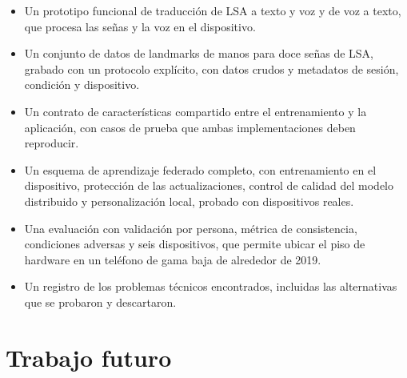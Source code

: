 \begin{itemize}
    \item Un prototipo funcional de traducción de LSA a texto y voz y de voz a texto, que procesa las señas y la voz en el dispositivo.
    \item Un conjunto de datos de landmarks de manos para doce señas de LSA, grabado con un protocolo explícito, con datos crudos y metadatos de sesión, condición y dispositivo.
    \item Un contrato de características compartido entre el entrenamiento y la aplicación, con casos de prueba que ambas implementaciones deben reproducir.
    \item Un esquema de aprendizaje federado completo, con entrenamiento en el dispositivo, protección de las actualizaciones, control de calidad del modelo distribuido y personalización local, probado con dispositivos reales.
    \item Una evaluación con validación por persona, métrica de consistencia, condiciones adversas y seis dispositivos, que permite ubicar el piso de hardware en un teléfono de gama baja de alrededor de 2019.
    \item Un registro de los problemas técnicos encontrados, incluidas las alternativas que se probaron y descartaron.
\end{itemize}

\section{Trabajo futuro}

